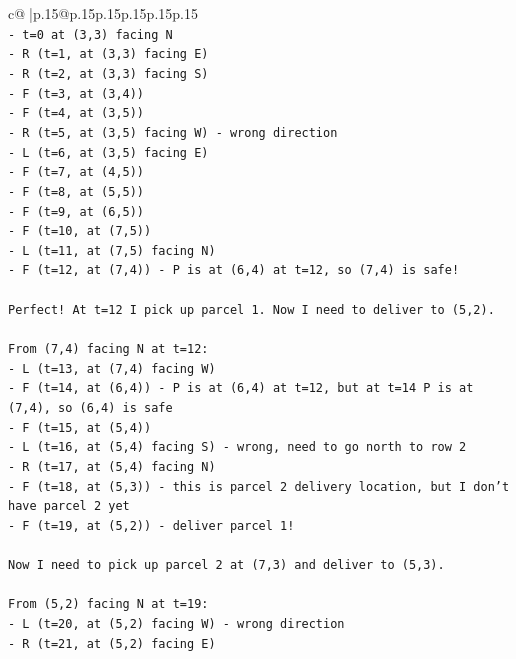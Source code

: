 \documentclass{article}
\begin{document}
{\begin{supertabular}{c@{$\;$}|p{.15\linewidth}@{}p{.15\linewidth}p{.15\linewidth}p{.15\linewidth}p{.15\linewidth}p{.15\linewidth}}
{{{\\ 
\texttt{{-} t=0 at (3,3) facing N} \\
\texttt{{-} R (t=1, at (3,3) facing E)} \\
\texttt{{-} R (t=2, at (3,3) facing S)} \\
\texttt{{-} F (t=3, at (3,4))} \\
\texttt{{-} F (t=4, at (3,5))} \\
\texttt{{-} R (t=5, at (3,5) facing W) {-} wrong direction} \\
\texttt{{-} L (t=6, at (3,5) facing E)} \\
\texttt{{-} F (t=7, at (4,5))} \\
\texttt{{-} F (t=8, at (5,5))} \\
\texttt{{-} F (t=9, at (6,5))} \\
\texttt{{-} F (t=10, at (7,5))} \\
\texttt{{-} L (t=11, at (7,5) facing N)} \\
\texttt{{-} F (t=12, at (7,4)) {-} P is at (6,4) at t=12, so (7,4) is safe!} \\
\\ 
\texttt{Perfect! At t=12 I pick up parcel 1. Now I need to deliver to (5,2).} \\
\\ 
\texttt{From (7,4) facing N at t=12:} \\
\texttt{{-} L (t=13, at (7,4) facing W)} \\
\texttt{{-} F (t=14, at (6,4)) {-} P is at (6,4) at t=12, but at t=14 P is at (7,4), so (6,4) is safe} \\
\texttt{{-} F (t=15, at (5,4))} \\
\texttt{{-} L (t=16, at (5,4) facing S) {-} wrong, need to go north to row 2} \\
\texttt{{-} R (t=17, at (5,4) facing N)} \\
\texttt{{-} F (t=18, at (5,3)) {-} this is parcel 2 delivery location, but I don't have parcel 2 yet} \\
\texttt{{-} F (t=19, at (5,2)) {-} deliver parcel 1!} \\
\\ 
\texttt{Now I need to pick up parcel 2 at (7,3) and deliver to (5,3).} \\
\\ 
\texttt{From (5,2) facing N at t=19:} \\
\texttt{{-} L (t=20, at (5,2) facing W) {-} wrong direction} \\
\texttt{{-} R (t=21, at (5,2) facing E)} \\
}}}
\end{supertabular}}
\end{document}
